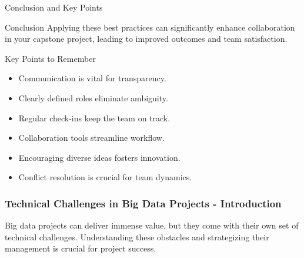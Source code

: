 \documentclass[aspectratio=169]{beamer}
\begin{document}
\begin{frame}[fragile]{Conclusion and Key Points}
    \begin{block}{Conclusion}
        Applying these best practices can significantly enhance collaboration in your capstone project, leading to improved outcomes and team satisfaction. 
    \end{block}

    \begin{block}{Key Points to Remember}
        \begin{itemize}
            \item Communication is vital for transparency.
            \item Clearly defined roles eliminate ambiguity.
            \item Regular check-ins keep the team on track.
            \item Collaboration tools streamline workflow.
            \item Encouraging diverse ideas fosters innovation.
            \item Conflict resolution is crucial for team dynamics.
        \end{itemize}
    \end{block}
\end{frame}

\begin{frame}[fragile]
    \frametitle{Technical Challenges in Big Data Projects - Introduction}
    
    Big data projects can deliver immense value, but they come with their own set of technical challenges.  
    Understanding these obstacles and strategizing their management is crucial for project success.
\end{frame}
\end{document}
